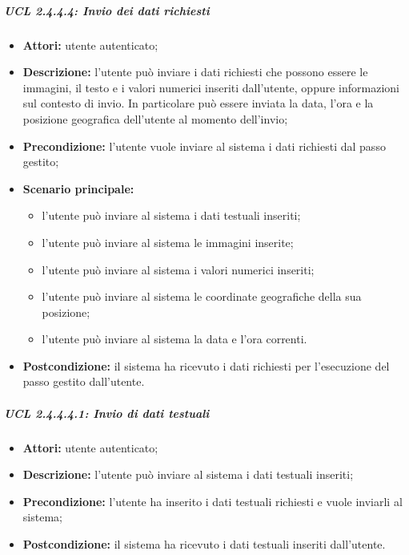 \subparagraph{UCL 2.4.4.4: Invio dei dati richiesti}
\begin{itemize}
\item \textbf{Attori:} utente autenticato;
\item \textbf{Descrizione:} l'utente può inviare i dati richiesti che possono essere le immagini, il testo e i valori numerici inseriti dall'utente, oppure informazioni sul contesto di invio. In particolare può essere inviata la data, l'ora e la posizione geografica dell'utente al momento dell'invio;
\item \textbf{Precondizione:} l'utente vuole inviare al sistema i dati richiesti dal passo gestito;
\item \textbf{Scenario principale:}
\begin{itemize}
\item l'utente può inviare al sistema i dati testuali inseriti;
\item l'utente può inviare al sistema le immagini inserite;
\item l'utente può inviare al sistema i valori numerici inseriti;
\item l'utente può inviare al sistema le coordinate geografiche della sua posizione;
\item l'utente può inviare al sistema la data e l'ora correnti.
\end{itemize}
\item \textbf{Postcondizione:} il sistema ha ricevuto i dati richiesti per l'esecuzione del passo gestito dall'utente.
\end{itemize}

\subparagraph{UCL 2.4.4.4.1: Invio di dati testuali}
\begin{itemize}
\item \textbf{Attori:} utente autenticato;
\item \textbf{Descrizione:} l'utente può inviare al sistema i dati testuali inseriti;
\item \textbf{Precondizione:} l'utente ha inserito i dati testuali richiesti e vuole inviarli al sistema;
\item \textbf{Postcondizione:} il sistema ha ricevuto i dati testuali inseriti dall'utente.
\end{itemize}

